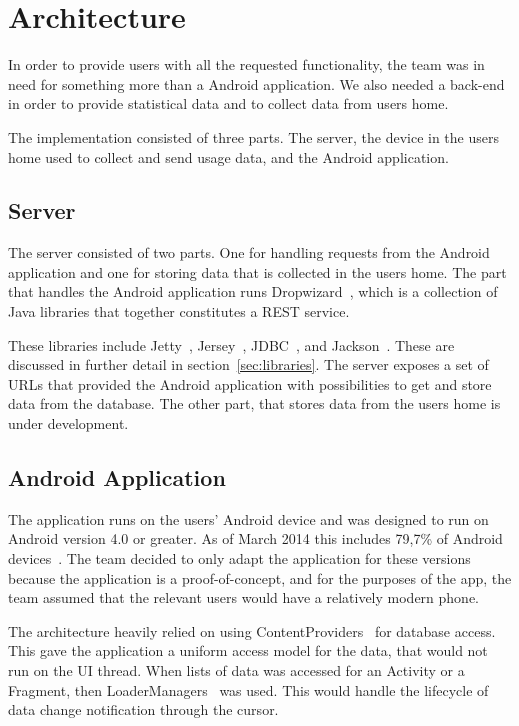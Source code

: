 \section{Architecture}
In order to provide users with all the requested functionality, the team was in need for something more than a Android application. We also needed a back-end in order to provide statistical data and to collect data from users home.

The implementation consisted of three parts. The server, the device in the users home used to collect and send usage data, and the Android application.

\subsection{Server}
The server consisted of two parts. One for handling requests from the Android application and one for storing data that is collected in the users home. 
The part that handles the Android application runs Dropwizard~\cite{dropwizard}, which is a collection of Java libraries that together constitutes a REST service. 

These libraries include Jetty~\cite{jetty}, Jersey~\cite{jersey}, JDBC~\cite{jdbc}, and Jackson~\cite{jackson}. These are discussed in further detail in section~\ref{sec:libraries}.
The server exposes a set of URLs that provided the Android application with 
possibilities to get and store data from the database. The other part, that stores data from the users home is under development.

\subsection{Android Application}
The application runs on the users' Android device and was designed to run on Android version 4.0 or greater. As of March 2014 this includes 79,7\% of Android devices~\cite{AndroidDeviceFragmentation}. The team decided to only adapt the application for these versions because the application is a proof-of-concept, and for the purposes of the app, the team assumed that the relevant users would have a relatively modern phone. 

The architecture heavily relied on using ContentProviders~\cite{contentproviders} for database access. This gave the application a uniform access model for the data, that would not run on the UI thread. When lists of data was accessed for an Activity or a Fragment, then LoaderManagers~\cite{loadermanager} was used. This would handle the lifecycle of data change notification through the cursor. 


